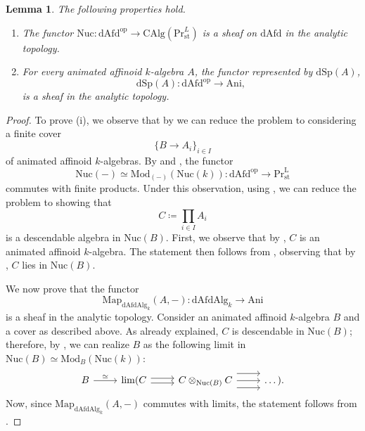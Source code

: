 \documentclass[oneside, hidelinks, 12pt, a4paper,reqno]{amsart}
\theoremstyle{plain}
\theoremstyle{definition}
\theoremstyle{plain}
\newtheorem{lemma}[lemma]{Lemma}
\newcommand{\rL}{\mathrm L}
\newcommand{\LPr}{\mathrm{Pr}^\rL}
\newcommand{\Nuc}{\mathrm{Nuc}}
\newcommand{\Mod}{\mathrm{Mod}}
\newcommand{\Map}{\mathrm{Map}}
\newcommand{\Ani}{\mathrm{Ani}}
\begin{document}
\begin{lemma}\label{lem: Nuc is a sheaf}
The following properties hold.
\begin{enumerate}
    \item[(i)] The functor $\Nuc \colon \mathrm{dAfd}^{\mathrm{op}} \to \mathrm{CAlg}(\mathrm{Pr}^L_{\mathrm{st}})$ is a sheaf on $\mathrm{dAfd}$ in the analytic topology.
    \item[(ii)] For every animated affinoid $k$-algebra $A$, the functor represented by $\mathrm{dSp}(A)$,
    \[
    \mathrm{dSp}(A) \colon \mathrm{dAfd}^{\mathrm{op}} \to \mathrm{Ani},
    \]
    is a sheaf in the analytic topology.
\end{enumerate}
\end{lemma}
\begin{proof}
    To prove (i), we observe that by  we can reduce the problem to considering a finite cover
    \[
    \{B \to A_i\}_{i\in I}
    \]
    of animated affinoid $k$-algebras. 
    By  and \cite[Lemma D.3.5.5]{SAG}, the functor 
    \[
    \Nuc(-)\simeq \Mod_{(-)}(\Nuc(k))\colon \mathrm{dAfd}^{\mathrm{op}} \to \LPr_{\mathrm{st}}
    \]
    commutes with finite products. Under this observation, using \cite[Proposition 3.22]{mathew2016galoisgroupstablehomotopy}, we can reduce the problem to showing that 
    \[
    C \coloneqq \prod_{i \in I} A_{i}
    \]
    is a descendable algebra in $\Nuc(B)$. 
    First, we observe that by , $C$ is an animated affinoid $k$-algebra. The statement then follows from \cite[Theorem 4.15]{mikami2023fppfdescentcondensedanimatedrings}, observing that by , $C$ lies in $\Nuc(B)$. 
    
    We now prove that the functor 
\[
\mathrm{Map}_{\mathrm{dAfdAlg}_k}(A,-)\colon \mathrm{dAfdAlg}_k \to \Ani
\]
is a sheaf in the analytic topology. Consider an animated affinoid $k$-algebra $B$ and a cover as described above. As already explained, $C$ is descendable in $\Nuc(B)$; therefore, by \cite[Proposition 3.20]{mathew2016galoisgroupstablehomotopy}, we can realize $B$ as the following limit in $\Nuc(B)\simeq \Mod_{B}(\Nuc(k))$:
    \[
   \begin{tikzcd}
	B & {\lim(C } & {C\otimes_{\Nuc(B)}C} & {\dots).}
	\arrow["{\simeq }", from=1-1, to=1-2]
	\arrow[shift right, from=1-2, to=1-3]
	\arrow[shift left, from=1-2, to=1-3]
	\arrow[from=1-3, to=1-4]
	\arrow[shift left=3, from=1-3, to=1-4]
	\arrow[shift right=3, from=1-3, to=1-4]
\end{tikzcd}
    \]
    Now, since $\Map_{\mathrm{dAfdAlg}_k}(A,-)$ commutes with limits, the statement follows from \cite[Proposition 4.6.2.17]{HA}.
\end{proof}
\end{document}
